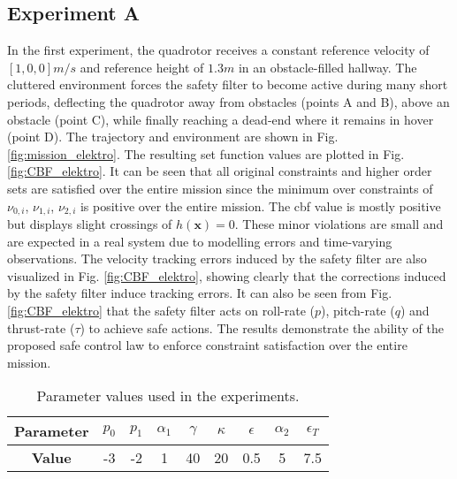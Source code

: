 \subsection{Experiment A}
In the first experiment, the quadrotor receives a constant reference velocity of $[1,0,0]\unit{m/s}$  and reference height of $1.3\unit{m}$ in an obstacle-filled hallway. The cluttered environment forces the safety filter to become active during many short periods, deflecting the quadrotor away from obstacles (points A and B), above an obstacle (point C), while finally reaching a dead-end where it remains in hover (point D). The trajectory and environment are shown in Fig. \ref{fig:mission_elektro}. The resulting set function values are plotted in Fig. \ref{fig:CBF_elektro}. It can be seen that all original constraints and higher order sets are satisfied over the entire mission since the minimum over constraints of $\nu_{0,i}$, $\nu_{1,i}$, $\nu_{2,i}$ is positive over the entire mission. The \ac{cbf} value is mostly positive but displays slight crossings of $h(\mathbf{x})=0$. These minor violations are small and are expected in a real system due to modelling errors and time-varying observations. The velocity tracking errors induced by the safety filter are also visualized in Fig. \ref{fig:CBF_elektro}, showing clearly that the corrections induced by the safety filter induce tracking errors. It can also be seen from Fig. \ref{fig:CBF_elektro} that the safety filter acts on roll-rate ($p$), pitch-rate ($q$) and thrust-rate ($\tau$) to achieve safe actions. The results demonstrate the ability of the proposed safe control law to enforce constraint satisfaction over the entire mission.

\begin{table}[t]
    \centering
    \caption{Parameter values used in the experiments.}
    \label{tab:parameters}
    \setlength{\tabcolsep}{5.5pt} %
    \renewcommand{\arraystretch}{1} %
    \begin{tabular}{c|cccccccc}
        \toprule
        \textbf{Parameter} & $p_0$ & $p_1$ & $\alpha_1$ & $\gamma$ & $\kappa$ & $\epsilon$ & $\alpha_2$  & $\epsilon_T$ \\
        \midrule
        \textbf{Value} & -3 & -2 & 1 & 40 & 20 & 0.5 & 5 & 7.5 \\
        \bottomrule
    \end{tabular}
    \vspace{-4ex}
\end{table}

